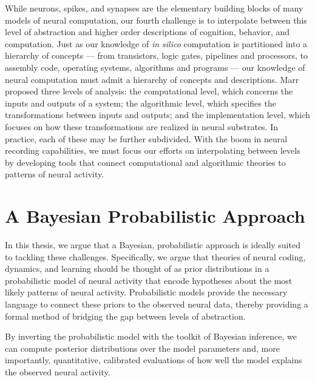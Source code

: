 While neurons, spikes, and synapses are the elementary building blocks
of many models of neural computation, our fourth challenge is to
interpolate between this level of abstraction and higher order
descriptions of cognition, behavior, and computation.  Just as our
knowledge of \emph{in silico} computation is partitioned into a
hierarchy of concepts --- from transistors, logic gates, pipelines and
processors, to assembly code, operating systems, algorithms and
programs --- our knowledge of neural computation must admit a hierarchy
of concepts and descriptions.  Marr proposed three levels of analysis:
the computational level, which concerns the inputs and outputs of a
system; the algorithmic level, which specifies the transformations
between inputs and outputs; and the implementation level, which
focuses on how these transformations are realized in neural
substrates. In practice, each of these may be further subdivided. 
With the boom in neural recording capabilities, we must focus our efforts
on interpolating between levels by developing tools that connect
computational and algorithmic theories to patterns of neural activity.


\section{A Bayesian Probabilistic Approach} 
In this thesis, we argue that a Bayesian, probabilistic approach is
ideally suited to tackling these challenges. Specifically, we argue
that theories of neural coding, dynamics, and learning should be
thought of as prior distributions in a probabilistic model of neural
activity that encode hypotheses about the most likely patterns of
neural activity. Probabilistic models provide the necessary language
to connect these priors to the observed neural data, thereby providing
a formal method of bridging the gap between levels of abstraction.



By inverting the
probabilistic model with the toolkit of Bayesian inference, we can
compute posterior distributions over the model parameters and,
more importantly, quantitative, calibrated evaluations of how well
the model explains the observed neural activity.


